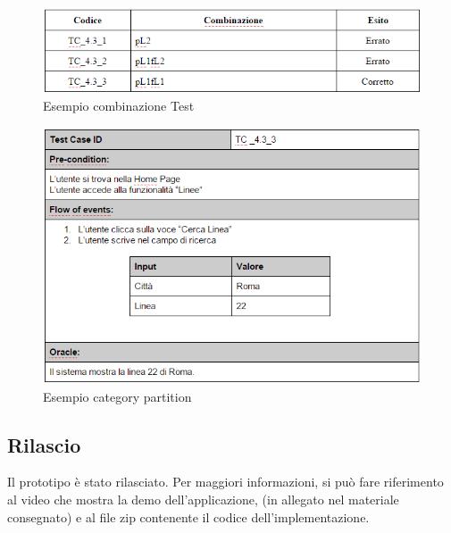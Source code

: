 \begin{figure}[h]
\centering
\includegraphics[scale=.5]{img/22.png}
\caption{Esempio combinazione Test}
\label{fig:mhs}
\end{figure} 

\begin{figure}[h]
\centering
\includegraphics[scale=.5]{img/23.png}
\caption{Esempio category partition }
\label{fig:mhs}
\end{figure} 

\subsection{Rilascio}
Il prototipo \`{e} stato rilasciato. Per maggiori informazioni, si pu\`{o} fare riferimento al video che mostra la demo dell\rq applicazione, (in allegato nel materiale consegnato) e al file zip contenente il codice dell\rq implementazione.
